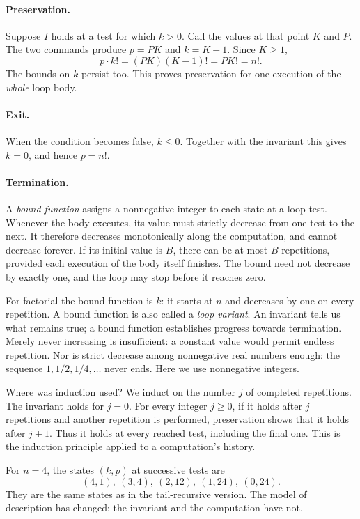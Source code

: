 \paragraph{Preservation.}
Suppose $I$ holds at a test for which $k>0$. Call the values at that point
$K$ and $P$. The two commands produce $p=PK$ and $k=K-1$. Since $K\geq1$,
\[
p\cdot k!=(PK)(K-1)!=P K!=n!.
\]
The bounds on $k$ persist too. This proves preservation for one execution
of the \emph{whole} loop body.

\paragraph{Exit.}
When the condition becomes false, $k\leq0$. Together with the invariant
this gives $k=0$, and hence $p=n!$.

\paragraph{Termination.}
A \emph{bound function} assigns a nonnegative integer to each state
at a loop test. Whenever the body executes, its value must strictly
decrease from one test to the next. It therefore decreases monotonically
along the computation, and cannot decrease forever. If its initial value
is $B$, there can be at most $B$ repetitions, provided each execution of
the body itself finishes. The bound need not decrease by exactly one,
and the loop may stop before it reaches zero.

For factorial the bound function is $k$: it starts at $n$ and decreases
by one on every repetition. A bound function is also called a
\emph{loop variant}. An invariant tells us what remains true; a bound
function establishes progress towards termination. Merely never increasing
is insufficient: a constant value would permit endless repetition.
Nor is strict decrease among nonnegative real numbers enough: the sequence
$1,1/2,1/4,\ldots$ never ends. Here we use nonnegative integers.

Where was induction used? We induct on the number $j$ of completed
repetitions. The invariant holds for $j=0$. For every integer $j\geq0$,
if it holds after $j$ repetitions and another repetition is performed,
preservation shows that it holds after $j+1$. Thus it holds at every
reached test, including the final one. This is the induction principle
applied to a computation's history.

For $n=4$, the states $(k,p)$ at successive tests are
\[
(4,1),\ (3,4),\ (2,12),\ (1,24),\ (0,24).
\]
They are the same states as in the tail-recursive version. The model of
description has changed; the invariant and the computation have not.

